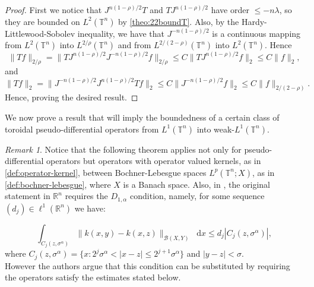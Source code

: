 \documentclass[12pt, reqno]{amsart}
\theoremstyle{definition}
\theoremstyle{remark}
\newtheorem{remark}[theorem]{Remark}
\numberwithin{equation}{section}
\newcommand*\diff{\mathop{}\!\mathrm{d}}
\begin{document}
\begin{proof}
    First we notice that $J^{n(1-\rho)/2}T$ and $TJ^{n(1-\rho)/2}$ have order $\leq -n\lambda$, so they are bounded on $L^2(\mathbb{T}^n)$ by \cref{theo:22boundT}. Also, by the Hardy-Littlewood-Sobolev inequality, we have that $J^{-n(1-\rho)/2}$ is a continuous mapping from $L^2(\mathbb{T}^n)$ into $L^{2/\rho}(\mathbb{T}^n)$ and from $L^{2/(2-\rho)}(\mathbb{T}^n)$ into $L^2(\mathbb{T}^n)$. Hence 
    \begin{equation*}
        \| Tf \|_{2/\rho} = \| TJ^{n(1-\rho)/2}J^{-n(1-\rho)/2}f\|_{2/\rho} \leq C\| TJ^{n(1-\rho)/2}f \|_2 \leq C\|f\|_2 ,
    \end{equation*}
    and 
    \begin{equation*}
        \| Tf \|_{2} = \| J^{-n(1-\rho)/2}J^{n(1-\rho)/2}Tf\|_{2} \leq C\| J^{-n(1-\rho)/2}f \|_2 \leq C\| f \|_{2/(2-\rho)}.
    \end{equation*}
    Hence, proving the desired result.
\end{proof}
We now prove a result that will imply the boundedness of a certain class of toroidal pseudo-differential operators from $L^1(\mathbb{T}^n)$ into weak-$L^1(\mathbb{T}^n)$.
\begin{remark}
    Notice that the following theorem applies not only for pseudo-differential operators but operators with operator valued kernels, as in \cref{def:operator-kernel}, between Bochner-Lebesgue spaces $L^p(\mathbb{T}^n;X)$, as in \cref{def:bochner-lebesgue}, where $X$ is a Banach space. Also, in \cite[Theorem~4.1]{alvarez-milman}, the original statement in $\mathbb{R}^n$ requires the $D_{1,\alpha}$ condition, namely, for some sequence $(d_j) \in \ell^1(\mathbb{R}^n)$ we have:
    
    \begin{equation*}
        \int_{C_j(z, \sigma^\alpha)} \|k(x, y) - k(x, z)\|_{\mathcal{B}(X, Y)}\diff x \leq d_j|C_j(z, \sigma^\alpha)|,
    \end{equation*}
    where $C_j(z, \sigma^\alpha) = \{ x : 2^j\sigma^\alpha < |x - z| \leq 2^{j+1}\sigma^\alpha\}$ and $|y-z|<\sigma$.\\
    
    However the authors argue that this condition can be substituted by requiring the operators satisfy the estimates stated below.
\end{remark}
\end{document}
